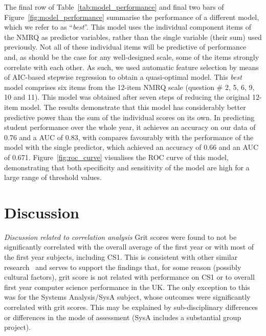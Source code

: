 \documentclass[sigconf]{acmart}
\begin{document}
The final row of Table~\ref{tab:model_performance} and final two bars of Figure~\ref{fig:model_performance} summarise the performance of a different model, which we refer to as ``{\em best}''. This model uses the individual component items of the NMRQ as predictor variables, rather than the single variable (their sum) used previously. Not all of these individual items will be predictive of performance and, as should be the case for any well-designed scale, some of the items strongly correlate with each other. As such, we used  automatic feature selection by means of AIC-based stepwise regression to obtain a quasi-optimal model. This {\em best} model comprises six items from the 12-item NMRQ scale (question \# 2, 5, 6, 9, 10 and 11). This model was obtained after seven steps of reducing the original 12-item model. The results demonstrate that this model has considerably better predictive power than the sum of the individual scores on its own. In predicting student performance over the whole year, it achieves an accuracy on our data of 0.76 and a AUC of 0.83, with compares favourably with the performance of the model with the single predictor, which achieved an accuracy of 0.66 and an AUC of 0.671. Figure~\ref{fig:roc_curve} visualises the ROC curve of this model, demonstrating that both specificity and sensitivity of the model are high for a large range of threshold values.

\section{Discussion}
{\em Discussion related to correlation analysis}
Grit scores were found to not be significantly correlated with the overall average of the first year or with most of the first year subjects, including CS1. This is consistent with other similar research~\cite{Sigurdson:2018:EGC:3279720.3279743} and serves to support the findings that, for some reason (possibly cultural factors), grit score is not related with performance on CS1 or to overall first year computer science performance in the UK. The only exception to this was for the Systems Analysis/SysA subject, whose outcomes were significantly correlated with grit scores. This may be explained by sub-disciplinary differences or differences in the mode of assessment (SysA includes a substantial group project). 
\end{document}
